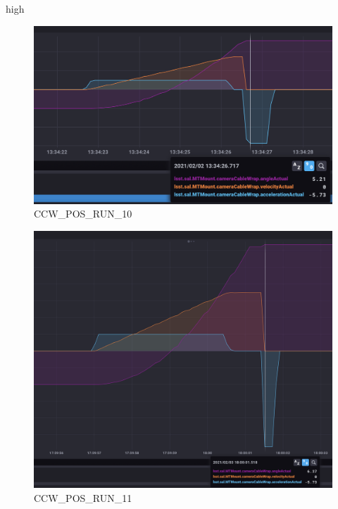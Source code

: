 high\documentclass[SE,lsstdraft,authoryear,toc]{lsstdoc}
\begin{document}
\begin{figure}[h!]
  \includegraphics[width=\linewidth]{media/CCW_design_speed_pos_test10.png}
  \caption{CCW\_POS\_RUN\_10}
  \label{fig:CCW_POS_RUN_10}
\end{figure}
\begin{figure}[h!]
  \includegraphics[width=\linewidth]{media/CCW_design_speed_pos_test11.png}
  \caption{CCW\_POS\_RUN\_11}
  \label{fig:CCW_POS_RUN_11}
\end{figure}
\end{document}
